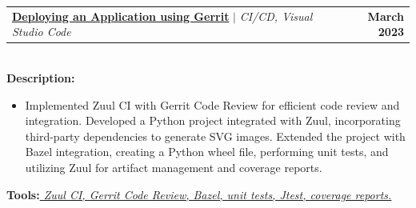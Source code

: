 \documentclass[letterpaper,11pt]{article}
\makeatletter
\newcommand{\resumeItem}[1]{
  \item\small{
    {#1 \vspace{-2pt}}
  }
}
\newcommand{\resumeProjectHeading}[2]{
    \item
    \begin{tabular*}{1.001\textwidth}{l@{\extracolsep{\fill}}r}
      \small#1 & \textbf{\small #2}\\
    \end{tabular*}\vspace{-7pt}
}
\newcommand{\resumeItemListStart}{\begin{itemize}}
\newcommand{\resumeItemListEnd}{\end{itemize}\vspace{-5pt}}
\makeatother
\begin{document}
      \resumeProjectHeading
      {\href{https://review.gerrithub.io/admin/repos/saiyakkshit/py-chess-svg,general}{\textbf{Deploying an Application using Gerrit}} $|$ \emph{CI/CD, Visual Studio Code \faGithub}}
      {March 2023}\\
          \vspace{6pt}
          \textbf{Description:}
          \vspace{-5pt}
          \resumeItemListStart
          \resumeItem{Implemented Zuul CI with Gerrit Code Review for efficient code review and integration. Developed a Python project integrated with Zuul, incorporating third-party dependencies to generate SVG images. Extended the project with Bazel integration, creating a Python wheel file, performing unit tests, and utilizing Zuul for artifact management and coverage reports.}

      
            
    
          \resumeItemListEnd 
          \textbf{Tools:}\emph{\href{https://review.gerrithub.io/admin/repos/saiyakkshit/py-chess-svg,general}{
Zuul CI, Gerrit Code Review, Bazel, unit tests, Jtest, coverage reports.}}

        \vspace{-18pt}

%

                
                            
\end{document}
